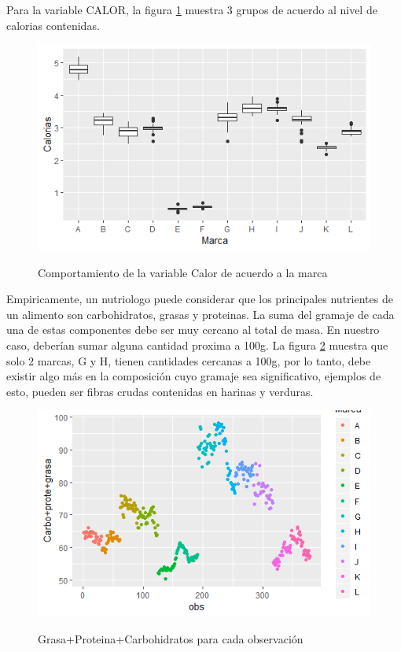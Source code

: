 \documentclass[12pt, letterpaper]{article}
\begin{document}
Para la variable CALOR, la figura \ref{i9} muestra 3 grupos de acuerdo al nivel de calorias contenidas.\\

\begin{figure}[h]
\centering
\includegraphics[scale=1]{images/calor.png} 
\label{i9}
\caption{Comportamiento de la variable Calor de acuerdo a la marca}
\end{figure}

Empiricamente, un nutriologo puede considerar que los principales nutrientes de un alimento son carbohidratos, grasas y proteinas. La suma del gramaje de cada una de estas componentes debe ser muy cercano al total de masa. En nuestro caso, deberían sumar alguna cantidad proxima a 100g. La figura \ref{i10} muestra que solo 2 marcas, G y H, tienen cantidades cercanas a 100g, por lo tanto, debe existir algo más en la composición cuyo gramaje sea significativo, ejemplos de esto, pueden ser fibras crudas contenidas en harinas y verduras.\\

\begin{figure}[h]
\centering
\includegraphics[scale=1]{images/pgc.png} 
\label{i10}
\caption{Grasa+Proteina+Carbohidratos para cada observación}
\end{figure}
\end{document}

